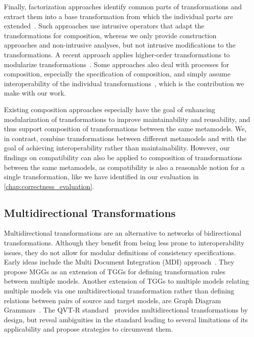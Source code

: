 Finally, factorization approaches identify common parts of transformations and extract them into a base transformation from which the individual parts are extended~\cite{cuadrado2008a}.
Such approaches use intrusive operators that adapt the transformations for composition, whereas we only provide construction approaches and non-intrusive analyses, but not intrusive modifications to the transformations.
A recent approach applies higher-order transformations to modularize transformations~\cite{fleck2017transformationModularization-TSE}.
Some approaches also deal with processes for composition, especially the specification of composition, and simply assume interoperability of the individual transformations~\cite{oldevik2005a}, which is the contribution we make with our work.

Existing composition approaches especially have the goal of enhancing modularization of transformations to improve maintainability and reusability, and thus support composition of transformations between the same metamodels. 
We, in contrast, combine transformations between different metamodels and with the goal of achieving interoperability rather than maintainability.
However, our findings on compatibility can also be applied to composition of transformations between the same metamodels, as compatibility is also a reasonable notion for a single transformation, like we have identified in our evaluation in \autoref{chap:correctness_evaluation}.


\subsection{Multidirectional Transformations}

Multidirectional transformations are an alternative to networks of bidirectional transformations.
Although they benefit from being less prone to interoperability issues, they do not allow for modular definitions of consistency specifications.
Early ideas include the Multi Document Integration (MDI) approach~\cite{koenigs2006MGGs-SoSym}. They propose \glspl{MGG} as an extension of \glspl{TGG} for defining transformation rules between multiple models.
Another extension of \glspl{TGG} to multiple models relating multiple models via one multidirectional transformation rather than defining relations between pairs of source and target models, are Graph Diagram Grammars~\cite{trollmann2015TransformationTGGtoMultiModel-ICMT, trollmann2016SynchronizationTGGtoMultiModel-ICMT}.
The QVT-R standard~\cite{qvt} provides multidirectional transformations by design, but \textcite{macedo2014FrameworkMultiDirectional-BX} reveal ambiguities in the standard leading to several limitations of its applicability  and propose strategies to circumvent them.

